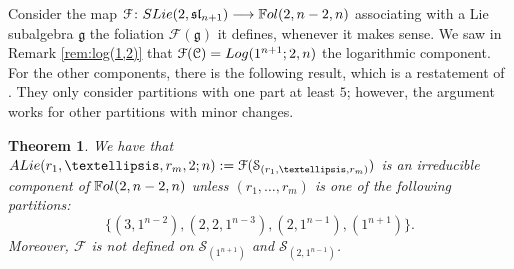 \documentclass[twoside]{amsart}
\numberwithin{equation}{section}
\DeclareMathOperator{\sing}{Sing}
\DeclareMathOperator{\codim}{codim}
\newcommand{\sln}{\mathfrak{sl}}
\newcommand{\Fol}{\mathbb{F}{\rm ol}}
\newcommand{\lra}{ \longrightarrow }
\newcommand{\del}[1]{\frac{\partial}{\partial #1}}
\newcommand{\exc}[3]{{\rm ALie}(#1,#2;#3)}
\newtheorem{theorem}{Theorem}[section]
\theoremstyle{definition}
\begin{document}
Consider the map $\mathcal{F} \colon {\rm SLie }(2, \sln_{n+1})   \lra  \Fol(2,n-2,n)$ associating with a Lie subalgebra $\mathfrak{g}$ the foliation $\mathcal{F}(\mathfrak{g})$ it defines, whenever it makes sense. 
We saw in Remark \ref{rem:log(1,2)} that $\mathcal{F}(\mathcal{C}) = {\rm Log}(1^{n+1};2,n)$ the logarithmic component. For the other components, there is the following result, which is a restatement of \cite[Theorem 3.6]{PdS}. They only consider partitions with one part at least $5$; however, the argument works for other partitions with minor changes. 

\begin{theorem}\cite[Theorem 3.6]{PdS}\label{thm:lie-comps}
We have that  $\exc{r_1, \dots, r_m}{2}{n} :=  \mathcal{F}(\mathcal{S}_{(r_1, \dots, r_m)})$ is an irreducible component of $\Fol(2,n-2,n)$ unless $(r_1, \dots, r_m)$ is one of the following partitions:
\[
\{ (3,1^{n-2}), (2,2,1^{n-3}), (2, 1^{n-1}), (1^{n+1}) \}.
\]
Moreover, $\mathcal{F}$ is not defined on $\mathcal{S}_{(1^{n+1})}$ and $\mathcal{S}_{(2, 1^{n-1})}$.
\end{theorem}




\end{document}
